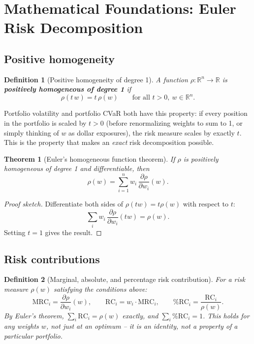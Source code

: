 \documentclass[11pt]{article}
\newtheorem{theorem}{Theorem}
\newtheorem{definition}{Definition}
\begin{document}
\section{Mathematical Foundations: Euler Risk Decomposition}
\label{sec:euler}

\subsection{Positive homogeneity}

\begin{definition}[Positive homogeneity of degree 1]
A function $\rho : \mathbb{R}^n \to \mathbb{R}$ is \textbf{positively
homogeneous of degree 1} if
\[
\rho(t\, w) = t \, \rho(w) \qquad \text{for all } t > 0,\ w \in \mathbb{R}^n .
\]
\end{definition}

Portfolio volatility and portfolio CVaR both have this property: if every
position in the portfolio is scaled by $t>0$ (before renormalizing weights
to sum to 1, or simply thinking of $w$ as dollar exposures), the risk
measure scales by exactly $t$. This is the property that makes an
\emph{exact} risk decomposition possible.

\begin{theorem}[Euler's homogeneous function theorem]
If $\rho$ is positively homogeneous of degree 1 and differentiable, then
\[
\rho(w) = \sum_{i=1}^n w_i \, \frac{\partial \rho}{\partial w_i}(w).
\]
\end{theorem}

\begin{proof}[Proof sketch]
Differentiate both sides of $\rho(tw) = t\rho(w)$ with respect to $t$:
\[
\sum_i w_i \, \frac{\partial \rho}{\partial w_i}(tw) = \rho(w).
\]
Setting $t = 1$ gives the result.
\end{proof}

\subsection{Risk contributions}

\begin{definition}[Marginal, absolute, and percentage risk contribution]
\label{def:rc}
For a risk measure $\rho(w)$ satisfying the conditions above:
\[
\text{MRC}_i = \frac{\partial \rho}{\partial w_i}(w), \qquad
\text{RC}_i = w_i \cdot \text{MRC}_i, \qquad
\text{\%RC}_i = \frac{\text{RC}_i}{\rho(w)} .
\]
By Euler's theorem, $\sum_i \text{RC}_i = \rho(w)$ exactly, and
$\sum_i \text{\%RC}_i = 1$. This holds for \emph{any} weights $w$, not
just at an optimum -- it is an identity, not a property of a particular
portfolio.
\end{definition}
\end{document}
